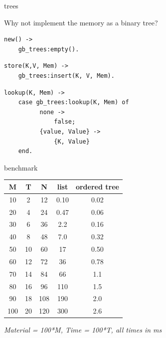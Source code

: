 \begin{frame}[fragile]{trees}

Why not implement the memory as a binary tree? 

\vspace{10pt}
\begin{verbatim}
new() ->
    gb_trees:empty().
\end{verbatim}
\pause
\begin{verbatim}    
store(K,V, Mem) ->
    gb_trees:insert(K, V, Mem).
\end{verbatim}
\pause
\begin{verbatim}        
lookup(K, Mem) ->
    case gb_trees:lookup(K, Mem) of 
          none ->  
              false; 
          {value, Value} ->  
              {K, Value}
    end.
\end{verbatim}

\end{frame}

\begin{frame}{benchmark}


\hspace{100pt}\begin{tabular}{|c|c|c|c|c|}
\hline 
       M & T & N & list & ordered tree\\
\hline
        10&          2&         12&         0.10&          0.02\\
        20&          4&         24&         0.47&          0.06\\
        30&          6&         36&        2.2&         0.16\\
        40&          8&         48&        7.0&         0.32\\
        50&         10&         60&       17&         0.50\\
        60&         12&         72&       36&         0.78\\
        70&         14&         84&       66&        1.1\\
        80&         16&         96&      110&        1.5\\
        90&         18&        108&      190&        2.0\\
       100&         20&        120&      300&        2.6\\
\hline
\end{tabular}

\vspace{10pt}
{\em Material = 100*M, Time = 100*T, all times in ms}

\end{frame}

